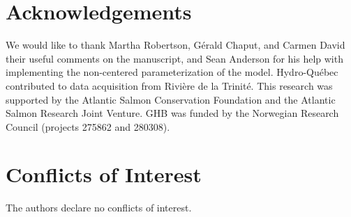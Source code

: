 \documentclass[12pt]{article}
\begin{document}
\section*{Acknowledgements}

We would like to thank Martha Robertson, G\'{e}rald Chaput, and Carmen David
their useful comments on the manuscript, and Sean Anderson for his help with
implementing the non-centered parameterization of the model. Hydro-Québec
contributed to data acquisition from Rivière de la Trinité. This research was
supported by the Atlantic Salmon Conservation Foundation and the Atlantic
Salmon Research Joint Venture.
GHB was funded by the Norwegian Research Council (projects 275862 and 280308).

\section*{Conflicts of Interest}

The authors declare no conflicts of interest.



%
\end{document}
